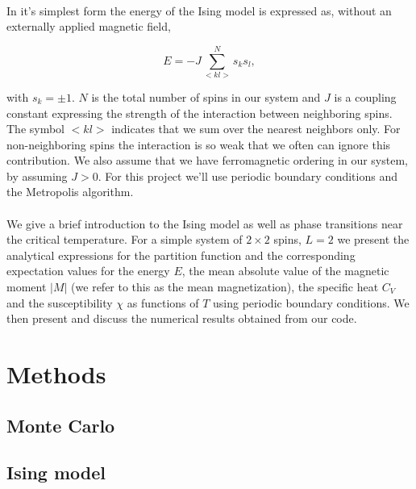 \documentclass[a4paper, fontsize=11pt]{article}
\begin{document}
\paragraph{}
In it's simplest form the energy of the Ising model is expressed as, without an externally applied magnetic field,

\begin{equation}
E = -J \sum^N_{<kl>} s_{k} s_{l},
\end{equation}

with $s_{k}=\pm 1$. $N$ is the total number of spins in our system and $J$ is a coupling constant expressing the strength of the interaction between neighboring spins. The symbol $<kl>$ indicates that we sum over the nearest neighbors only. For non-neighboring spins the interaction is so weak that we often can ignore this contribution. We also assume that we have ferromagnetic ordering in our system, by assuming $J> 0$. For this project we'll use periodic boundary conditions and the Metropolis algorithm.


\paragraph{}
We give a brief introduction to the Ising model as well as phase transitions near the critical temperature. For a simple system of $2 \times 2$ spins, $L = 2$ we present the analytical expressions for the partition function and the corresponding expectation values for the energy $E$, the mean absolute value of the magnetic moment $\lvert M \rvert$ (we refer to this as the mean magnetization), the specific heat $C_{V}$ and the susceptibility $\chi$ as functions of $T$ using periodic boundary conditions. We then present and discuss the numerical results obtained from our code.



\section{Methods}




\subsection{Monte Carlo}



\subsection{Ising model}
\end{document}
